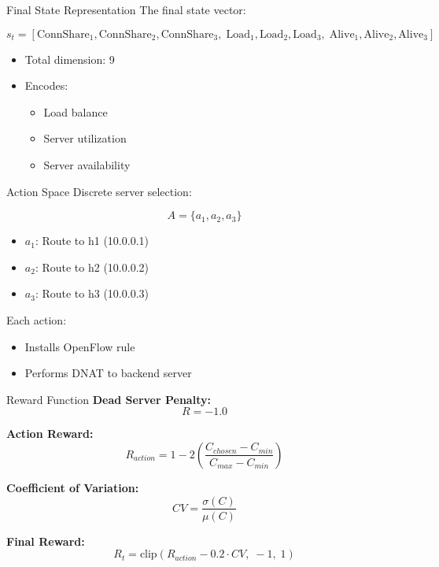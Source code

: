 \begin{frame}{Final State Representation}
The final state vector:

\[
s_t = [
\text{ConnShare}_1, \text{ConnShare}_2, \text{ConnShare}_3,\;
\text{Load}_1, \text{Load}_2, \text{Load}_3,\;
\text{Alive}_1, \text{Alive}_2, \text{Alive}_3
]
\]

\begin{itemize}
    \item Total dimension: 9
    \item Encodes:
    \begin{itemize}
        \item Load balance
        \item Server utilization
        \item Server availability
    \end{itemize}
\end{itemize}
\end{frame}

\begin{frame}{Action Space}
Discrete server selection:

\[
A = \{a_1, a_2, a_3\}
\]

\begin{itemize}
    \item $a_1$: Route to h1 (10.0.0.1)
    \item $a_2$: Route to h2 (10.0.0.2)
    \item $a_3$: Route to h3 (10.0.0.3)
\end{itemize}

Each action:
\begin{itemize}
    \item Installs OpenFlow rule
    \item Performs DNAT to backend server
\end{itemize}
\end{frame}

\begin{frame}{Reward Function}
\textbf{Dead Server Penalty:}
\[
R = -1.0
\]

\textbf{Action Reward:}
\[
R_{action} = 1 - 2 \left(\frac{C_{chosen} - C_{min}}{C_{max} - C_{min}}\right)
\]

\textbf{Coefficient of Variation:}
\[
CV = \frac{\sigma(C)}{\mu(C)}
\]

\textbf{Final Reward:}
\[
R_t = \text{clip}(R_{action} - 0.2 \cdot CV,\; -1,\; 1)
\]
\end{frame}

